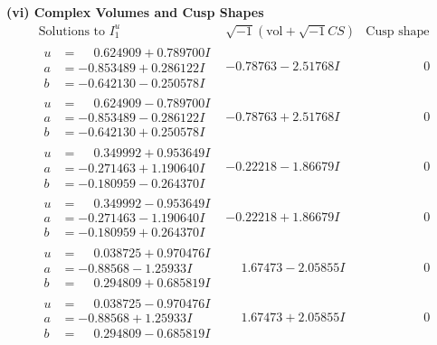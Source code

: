 \documentclass[1p]{elsarticle_modified}
\theoremstyle{definition}
\newcommand{\I}{\sqrt{-1}}
\begin{document}
\newpage\flushleft \textbf{(vi) Complex Volumes and Cusp Shapes}
$$\begin{array}{c|c|c}  
\text{Solutions to }I^u_{1}& \I (\text{vol} + \sqrt{-1}CS) & \text{Cusp shape}\\
 \hline 
\begin{aligned}
u &= \phantom{-}0.624909 + 0.789700 I \\
a &= -0.853489 + 0.286122 I \\
b &= -0.642130 - 0.250578 I\end{aligned}
 & -0.78763 - 2.51768 I & \phantom{-0.000000 } 0 \\ \hline\begin{aligned}
u &= \phantom{-}0.624909 - 0.789700 I \\
a &= -0.853489 - 0.286122 I \\
b &= -0.642130 + 0.250578 I\end{aligned}
 & -0.78763 + 2.51768 I & \phantom{-0.000000 } 0 \\ \hline\begin{aligned}
u &= \phantom{-}0.349992 + 0.953649 I \\
a &= -0.271463 + 1.190640 I \\
b &= -0.180959 - 0.264370 I\end{aligned}
 & -0.22218 - 1.86679 I & \phantom{-0.000000 } 0 \\ \hline\begin{aligned}
u &= \phantom{-}0.349992 - 0.953649 I \\
a &= -0.271463 - 1.190640 I \\
b &= -0.180959 + 0.264370 I\end{aligned}
 & -0.22218 + 1.86679 I & \phantom{-0.000000 } 0 \\ \hline\begin{aligned}
u &= \phantom{-}0.038725 + 0.970476 I \\
a &= -0.88568 - 1.25933 I \\
b &= \phantom{-}0.294809 + 0.685819 I\end{aligned}
 & \phantom{-}1.67473 - 2.05855 I & \phantom{-0.000000 } 0 \\ \hline\begin{aligned}
u &= \phantom{-}0.038725 - 0.970476 I \\
a &= -0.88568 + 1.25933 I \\
b &= \phantom{-}0.294809 - 0.685819 I\end{aligned}
 & \phantom{-}1.67473 + 2.05855 I & \phantom{-0.000000 } 0 \\ \hline\begin{aligned}

\end{aligned}
\end{array}$$
\end{document}
